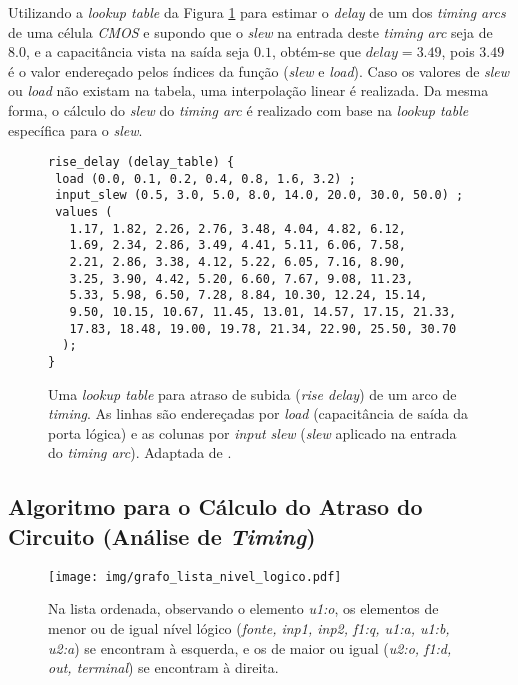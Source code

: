 \documentclass[
	12pt,				%
	openright,			%
	twoside,			%
	a4paper,			%
	english,			%
	french,				%
	spanish,			%
	brazil,				%
	]{abntex2}
\begin{document}
Utilizando a \textit{lookup table} da Figura \ref{fig:lookup_table} para estimar o \textit{delay} de um dos \textit{timing arcs} de uma célula \textit{CMOS} e supondo que o \textit{slew} na entrada deste \textit{timing arc} seja de $8.0$, e a capacitância vista na saída seja $0.1$, obtém-se que $delay = 3.49$, pois $3.49$ é o valor endereçado pelos índices da função (\textit{slew} e \textit{load}). Caso os valores de \textit{slew} ou \textit{load} não existam na tabela, uma interpolação linear é realizada. Da mesma forma, o cálculo do \textit{slew} do \textit{timing arc} é realizado com base na \textit{lookup table} específica para o \textit{slew}.

\begin{figure}[ht]
\lstset{basicstyle=\footnotesize}
\begin{lstlisting}[frame=single]
rise_delay (delay_table) {
 load (0.0, 0.1, 0.2, 0.4, 0.8, 1.6, 3.2) ;
 input_slew (0.5, 3.0, 5.0, 8.0, 14.0, 20.0, 30.0, 50.0) ;
 values (
   1.17, 1.82, 2.26, 2.76, 3.48, 4.04, 4.82, 6.12,
   1.69, 2.34, 2.86, 3.49, 4.41, 5.11, 6.06, 7.58,
   2.21, 2.86, 3.38, 4.12, 5.22, 6.05, 7.16, 8.90,
   3.25, 3.90, 4.42, 5.20, 6.60, 7.67, 9.08, 11.23,
   5.33, 5.98, 6.50, 7.28, 8.84, 10.30, 12.24, 15.14,
   9.50, 10.15, 10.67, 11.45, 13.01, 14.57, 17.15, 21.33,
   17.83, 18.48, 19.00, 19.78, 21.34, 22.90, 25.50, 30.70
  );
}
\end{lstlisting}
\caption{Uma \textit{lookup table} para atraso de subida (\textit{rise delay}) de um arco de \textit{timing}. As linhas são endereçadas por \textit{load} (capacitância de saída da porta lógica) e as colunas por \textit{input slew} (\textit{slew} aplicado na entrada do \textit{timing arc}). Adaptada de \cite{Contest2013}.}
\label{fig:lookup_table}
\end{figure}



\subsection{Algoritmo para o Cálculo do Atraso do Circuito (Análise de \textit{Timing})}

\begin{figure}[ht]
\begin{center}
\texttt{[image: img/grafo\_lista\_nivel\_logico.pdf]} 
\caption{Na lista ordenada, observando o elemento \textit{u1:o}, os elementos de menor ou de igual  nível lógico (\textit{fonte, inp1, inp2, f1:q, u1:a, u1:b, u2:a}) se encontram à esquerda, e os de maior ou igual (\textit{u2:o, f1:d, out, terminal}) se encontram à direita.}
\label{fig:grafo_lista_nivel_logico}
\end{center}
\end{figure}
\end{document}
